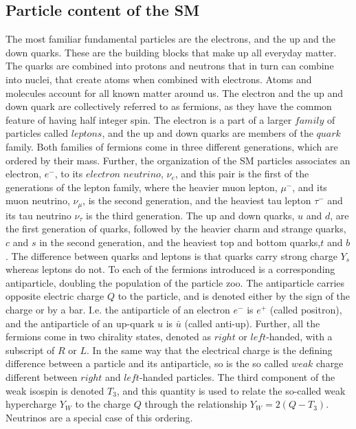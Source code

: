 \subsection*{Particle content of the SM}  
\noindent\justify
The most familiar fundamental particles are the electrons, and the up and the down quarks. 
These are the building blocks that make up all everyday matter. 
The quarks are combined into protons and neutrons that in turn can combine into nuclei, that create atoms when combined with electrons. 
Atoms and molecules account for all known matter around us. 
The electron and the up and down quark are collectively referred to as fermions, as they have the common feature of having half integer spin. 
The electron is a part of a larger $family$ of particles called $leptons$, and the up and down quarks are members of the $quark$ family.
Both families of fermions come in three different generations, which are ordered by their mass. 
Further, the organization of the SM particles associates an electron, $e^{-}$, to its $electron$ $neutrino$, $\nu_{e}$, and this pair is the first of the generations of the lepton family, where the heavier muon lepton, $\mu^{-}$, and its muon neutrino, $\nu_{\mu}$, is the second generation, and the heaviest tau lepton $\tau^{-}$ and its tau neutrino $\nu_{\tau}$ is the third generation.  
The up and down quarks, $u$ and $d$, are the first generation of quarks, followed by the heavier charm and strange quarks, $c$ and $s$ in the second generation, and the heaviest top and bottom quarks,$t$ and $b$. 
The difference between quarks and leptons is that quarks carry strong charge $Y_{s}$ whereas leptons do not. 
To each of the fermions introduced is a corresponding antiparticle, doubling the population of the particle zoo. 
The antiparticle carries opposite electric charge $Q$ to the particle, and is denoted either by the sign of the charge or by a bar. 
I.e. the antiparticle of an electron $e^{-}$ is $e^{+}$ (called positron), and the antiparticle of an up-quark $u$ is $\bar{u}$ (called anti-up). 
Further, all the fermions come in two chirality states, denoted as $right$ or $left$-handed, with a subscript of $R$ or $L$. 
In the same way that the electrical charge is the defining difference between a particle and its antiparticle, so is the so called $weak$ charge different between $right$ and $left$-handed particles. 
The third component of the weak isospin is denoted $T_{3}$, and this quantity is used to relate the so-called weak hypercharge $Y_{W}$ to the charge $Q$ through the relationship $Y_{W}=2(Q-T_{3})$. 
Neutrinos are a special case of this ordering. 
